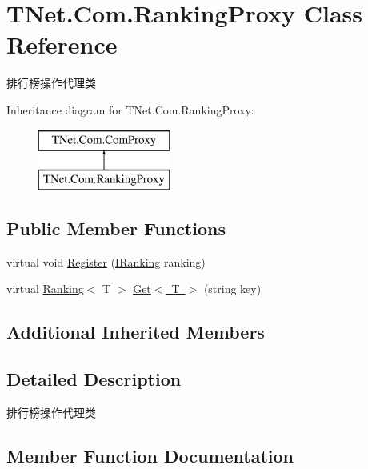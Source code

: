\hypertarget{class_t_net_1_1_com_1_1_ranking_proxy}{}\section{T\+Net.\+Com.\+Ranking\+Proxy Class Reference}
\label{class_t_net_1_1_com_1_1_ranking_proxy}


排行榜操作代理类  


Inheritance diagram for T\+Net.\+Com.\+Ranking\+Proxy\+:\begin{figure}[H]
\begin{center}
\leavevmode
\includegraphics[height=2.000000cm]{class_t_net_1_1_com_1_1_ranking_proxy}
\end{center}
\end{figure}
\subsection*{Public Member Functions}
\begin{DoxyCompactItemize}
\item 
virtual void \mbox{\hyperlink{class_t_net_1_1_com_1_1_ranking_proxy_a546f13778dc23b3c9b6e8f41ccafc020}{Register}} (\mbox{\hyperlink{interface_t_net_1_1_com_1_1_rank_1_1_i_ranking}{I\+Ranking}} ranking)
\item 
virtual \mbox{\hyperlink{class_t_net_1_1_com_1_1_rank_1_1_ranking}{Ranking}}$<$ T $>$ \mbox{\hyperlink{class_t_net_1_1_com_1_1_ranking_proxy_a2d2c6aba0d6990a0be20305270c081e7}{Get$<$ T $>$}} (string key)
\end{DoxyCompactItemize}
\subsection*{Additional Inherited Members}


\subsection{Detailed Description}
排行榜操作代理类 



\subsection{Member Function Documentation}
\mbox{\label{class_t_net_1_1_com_1_1_ranking_proxy_a2d2c6aba0d6990a0be20305270c081e7}} 
